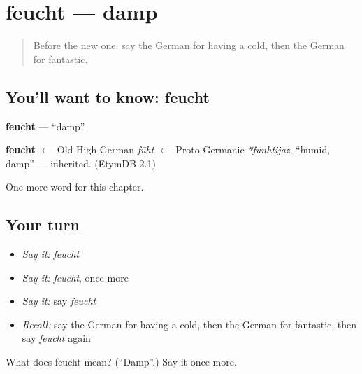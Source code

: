 \section[feucht]{feucht — damp}

\label{lesson:GE-C213-feucht}



\begin{quote}
Before the new one: say the German for having a cold, then the German for fantastic.
\end{quote}

\subsection*{You'll want to know: feucht}
\textbf{feucht} — \textquotedblleft{}damp\textquotedblright{}.

\begin{cousinweb}
\textbf{feucht} $\leftarrow$ Old High German \emph{fūht} $\leftarrow$ Proto-Germanic \emph{*funhtijaz}, \textquotedblleft{}humid, damp\textquotedblright{} — inherited. (EtymDB 2.1)
\end{cousinweb}

\begin{grammarlens}[title={What you've built}]
One more word for this chapter.
\end{grammarlens}

\subsection*{Your turn}
\begin{itemize}
\raggedright
  \item \emph{Say it:} \emph{feucht}
  \item \emph{Say it:} \emph{feucht}, once more
  \item \emph{Say it:} say \emph{feucht}
  \item \emph{Recall:} say the German for having a cold, then the German for fantastic, then say \emph{feucht} again
\end{itemize}

\begin{tcolorbox}[breakable,colback=teal!4,colframe=teal!35!black,title={Before you move on}]
What does feucht mean? (\textquotedblleft{}Damp\textquotedblright{}.) Say it once more.
\end{tcolorbox}

